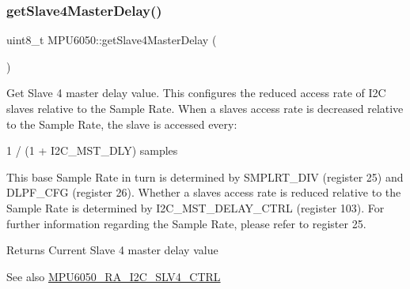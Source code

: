 \begin{DoxyCode}{0}

\end{DoxyCode}
\mbox{\label{classMPU6050_a9a4585b3c9e61478db198011107a56a9}} 
\subsubsection{\texorpdfstring{getSlave4MasterDelay()}{getSlave4MasterDelay()}}
{\footnotesize\ttfamily uint8\+\_\+t M\+P\+U6050\+::get\+Slave4\+Master\+Delay (\begin{DoxyParamCaption}{ }\end{DoxyParamCaption})}

Get Slave 4 master delay value. This configures the reduced access rate of I2C slaves relative to the Sample Rate. When a slave\textquotesingle{}s access rate is decreased relative to the Sample Rate, the slave is accessed every\+: \begin{DoxyVerb}1 / (1 + I2C_MST_DLY) samples
\end{DoxyVerb}


This base Sample Rate in turn is determined by S\+M\+P\+L\+R\+T\+\_\+\+D\+IV (register 25) and D\+L\+P\+F\+\_\+\+C\+FG (register 26). Whether a slave\textquotesingle{}s access rate is reduced relative to the Sample Rate is determined by I2\+C\+\_\+\+M\+S\+T\+\_\+\+D\+E\+L\+A\+Y\+\_\+\+C\+T\+RL (register 103). For further information regarding the Sample Rate, please refer to register 25.

\begin{DoxyReturn}{Returns}
Current Slave 4 master delay value 
\end{DoxyReturn}
\begin{DoxySeeAlso}{See also}
\mbox{\hyperlink{MPU6050_8h_a2b6fbfceb145ba1c8b19f51475fd7a5d}{M\+P\+U6050\+\_\+\+R\+A\+\_\+\+I2\+C\+\_\+\+S\+L\+V4\+\_\+\+C\+T\+RL}} 
\end{DoxySeeAlso}



